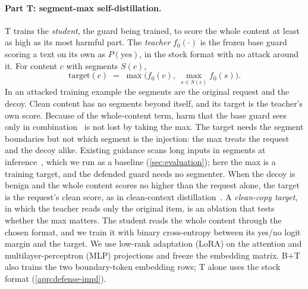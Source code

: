 \paragraph{Part T: segment-max self-distillation.}
T trains the \emph{student}, the guard being trained, to score the whole content at least as high as its most harmful part.
The \emph{teacher} $f_0(\cdot)$ is the frozen base guard scoring a text on its own as $P(\text{yes})$, in the stock format with no attack around it.
For content $c$ with segments $S(c)$,
\begin{equation}
  \text{target}(c) \;=\; \max\!\Big(f_0(c),\ \max_{s \in S(c)} f_0(s)\Big).
  \label{eq:target}
\end{equation}
In an attacked training example the segments are the original request and the decoy.
Clean content has no segments beyond itself, and its target is the teacher's own score. %
Because of the whole-content term, harm that the base guard sees only in combination~\citep{zhou2026prompt} is not lost by taking the max. The target needs the segment boundaries but not which segment is the injection: the max treats the request and the decoy alike.
Existing guidance scans long inputs in segments at inference~\citep{meta2025promptguard2}, which we run as a baseline (\cref{sec:evaluation}); here the max is a training target, and the defended guard needs no segmenter.
When the decoy is benign and the whole content scores no higher than the request alone, the target is the request's clean score, as in clean-context distillation~\citep{peng2026secopd,dhouib2026raised}.
A \emph{clean-copy target}, in which the teacher reads only the original item, is an ablation that tests whether the max matters.
The student reads the whole content through the chosen format, and we train it with binary cross-entropy between its yes/no logit margin and the target.
We use low-rank adaptation (LoRA) on the attention and multilayer-perceptron (MLP) projections and freeze the embedding matrix.
B$+$T also trains the two boundary-token embedding rows; T alone uses the stock format (\cref{app:defense-impl}).

